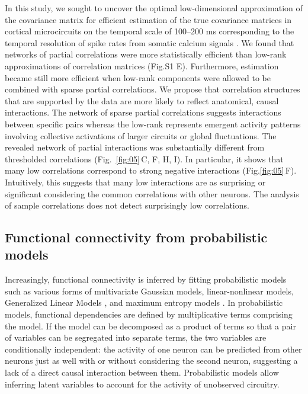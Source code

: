 \documentclass[10pt]{article}
\begin{document}
In this study, we sought to uncover the optimal low-dimensional approximation of the covariance matrix for efficient estimation of the true covariance matrices in cortical microcircuits on the temporal scale of 100--200 ms corresponding to the temporal resolution of spike rates from somatic calcium signals \cite{Cotton:2013}.  We found that networks of partial correlations were more statistically efficient than low-rank approximations of correlation matrices (Fig.\;S1 E). Furthermore, estimation became still more efficient when low-rank components were allowed to be combined with sparse partial correlations. We propose that correlation structures that are supported by the data  are more likely to reflect anatomical, causal interactions. The network of sparse partial correlations suggests interactions between specific pairs whereas the low-rank represents emergent activity patterns involving collective activations of larger circuits or global fluctuations. The revealed network of partial interactions was substantially different from thresholded correlations (Fig.~\ref{fig:05}\,C, F, H, I). In particular, it shows that many low correlations correspond to strong negative interactions (Fig.\;\ref{fig:05}\,F). Intuitively, this suggests that many low interactions are as surprising or significant considering the common correlations with other neurons. The analysis of sample correlations does not detect surprisingly low correlations.


\subsection*{Functional connectivity from probabilistic models}
Increasingly, functional connectivity is inferred by fitting probabilistic models such as various forms of multivariate Gaussian models, linear-nonlinear models, Generalized Linear Models \cite{Pillow:2008}, and maximum entropy models \cite{Schneidman:2006,Tkacik:2006,Tang:2008,Shlens:2009}. In probabilistic models, functional dependencies are defined by multiplicative terms comprising the model. If the model can be decomposed as a product of terms so that a pair of variables can be segregated into separate terms, the two variables are conditionally independent: the activity of one neuron can be predicted from other neurons just as well with or without considering the second neuron, suggesting a lack of a direct causal interaction between them. Probabilistic models allow inferring latent variables to account for the activity of unobserved circuitry.  
\end{document}
